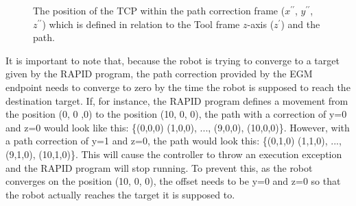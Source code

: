 \documentclass{cslthse-msc}
\begin{document}
\begin{figure}[H]
\centering
{}
\caption{The position of the TCP within the path correction frame ($x^{\prime\prime}$, $y^{\prime\prime}$, $z^{\prime\prime}$) which is defined in relation to the Tool frame $z$-axis ($z^{\prime}$) and the path.}
\label{fig:corr_frame}
\end{figure}

It is important to note that, because the robot is trying to converge to a target given by the RAPID program, the path correction provided by the EGM endpoint needs to converge to zero by the time the robot is supposed to reach the destination target. If, for instance, the RAPID program defines a movement from the position (0, 0 ,0) to the position (10, 0, 0), the path with a correction of y=0 and z=0 would look like this: \{(0,0,0) (1,0,0), ..., (9,0,0), (10,0,0)\}. However, with a path correction of y=1 and z=0, the path would look this: \{(0,1,0) (1,1,0), ..., (9,1,0), (10,1,0)\}. This will cause the controller to throw an execution exception and the RAPID program will stop running. To prevent this, as the robot converges on the position (10, 0, 0), the offset needs to be y=0 and z=0 so that the robot actually reaches the target it is supposed to. 
\end{document}

